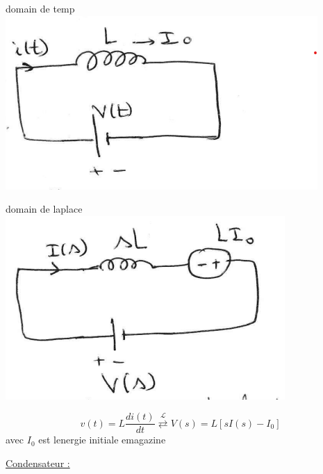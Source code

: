 \documentclass[12pt]{book}
\newcommand{\lagrange}{\mathcal{L}}
\begin{document}
                \begin{center}
                    \begin{minipage}{0,49\linewidth}
                        domain de temp \\
                        \includegraphics[width=\linewidth]{pic/bobine1.png}
                    \end{minipage}
                    \begin{minipage}{0,49\linewidth}
                        domain de laplace \\
                        \includegraphics[width=\linewidth]{pic/bobine2.png}
                    \end{minipage}
                    $$ v(t) = L\frac{di(t)}{dt} \overset{\lagrange}{\rightleftarrows}V(s)=L[sI(s) - I_0] $$ 
                    avec $I_0$ est lenergie initiale emagazine
                \end{center} 
                \underline{Condensateur :}
\end{document}
